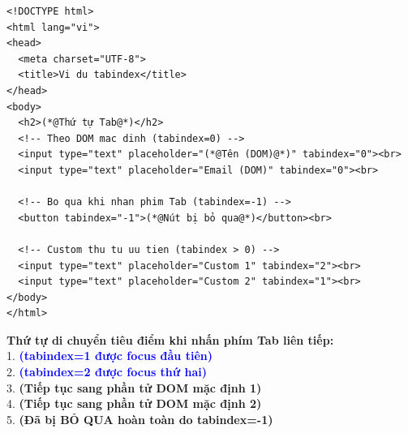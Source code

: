 \documentclass[11pt,oneside]{book}
\begin{document}
\begin{codeWindow}
\begin{lstlisting}[language=HTML5]
<!DOCTYPE html>
<html lang="vi">
<head>
  <meta charset="UTF-8">
  <title>Vi du tabindex</title>
</head>
<body>
  <h2>(*@Thứ tự Tab@*)</h2>
  <!-- Theo DOM mac dinh (tabindex=0) -->
  <input type="text" placeholder="(*@Tên (DOM)@*)" tabindex="0"><br>
  <input type="text" placeholder="Email (DOM)" tabindex="0"><br>
  
  <!-- Bo qua khi nhan phim Tab (tabindex=-1) -->
  <button tabindex="-1">(*@Nút bị bỏ qua@*)</button><br>
  
  <!-- Custom thu tu uu tien (tabindex > 0) -->
  <input type="text" placeholder="Custom 1" tabindex="2"><br>
  <input type="text" placeholder="Custom 2" tabindex="1"><br>
</body>
</html>
\end{lstlisting}
\end{codeWindow}

\begin{browserWindow}
\sffamily\small
\textbf{Thứ tự di chuyển tiêu điểm khi nhấn phím Tab liên tiếp:}\\[4pt]
1.  \quad \textcolor{blue}{\bfseries (tabindex=1 được focus đầu tiên)}\\[4pt]
2.  \quad \textcolor{blue}{\bfseries (tabindex=2 được focus thứ hai)}\\[4pt]
3.  \quad \textcolor{primaryBlue}{\bfseries (Tiếp tục sang phần tử DOM mặc định 1)}\\[4pt]
4.  \quad \textcolor{primaryBlue}{\bfseries (Tiếp tục sang phần tử DOM mặc định 2)}\\[4pt]
5.  \quad \textcolor{red!70!black}{\bfseries (Đã bị BỎ QUA hoàn toàn do tabindex=-1)}
\end{browserWindow}
\end{document}
